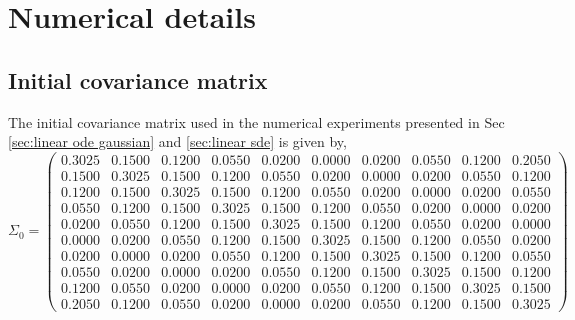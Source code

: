 \documentclass[11pt, a4paper, oneside, reqno]{amsart}
\begin{document}
\section{Numerical details}\label{app:numerical details}
\subsection{Initial covariance matrix}
\noindent The initial covariance matrix used in the numerical experiments presented in Sec \ref{sec:linear ode gaussian} and \ref{sec:linear sde} is given by,
\[
\Sigma_0 =
\begin{pmatrix}
0.3025 & 0.1500 & 0.1200 & 0.0550 & 0.0200 & 0.0000 & 0.0200 & 0.0550 & 0.1200 & 0.2050 \\
0.1500 & 0.3025 & 0.1500 & 0.1200 & 0.0550 & 0.0200 & 0.0000 & 0.0200 & 0.0550 & 0.1200 \\
0.1200 & 0.1500 & 0.3025 & 0.1500 & 0.1200 & 0.0550 & 0.0200 & 0.0000 & 0.0200 & 0.0550 \\
0.0550 & 0.1200 & 0.1500 & 0.3025 & 0.1500 & 0.1200 & 0.0550 & 0.0200 & 0.0000 & 0.0200 \\
0.0200 & 0.0550 & 0.1200 & 0.1500 & 0.3025 & 0.1500 & 0.1200 & 0.0550 & 0.0200 & 0.0000 \\
0.0000 & 0.0200 & 0.0550 & 0.1200 & 0.1500 & 0.3025 & 0.1500 & 0.1200 & 0.0550 & 0.0200 \\
0.0200 & 0.0000 & 0.0200 & 0.0550 & 0.1200 & 0.1500 & 0.3025 & 0.1500 & 0.1200 & 0.0550 \\
0.0550 & 0.0200 & 0.0000 & 0.0200 & 0.0550 & 0.1200 & 0.1500 & 0.3025 & 0.1500 & 0.1200 \\
0.1200 & 0.0550 & 0.0200 & 0.0000 & 0.0200 & 0.0550 & 0.1200 & 0.1500 & 0.3025 & 0.1500 \\
0.2050 & 0.1200 & 0.0550 & 0.0200 & 0.0000 & 0.0200 & 0.0550 & 0.1200 & 0.1500 & 0.3025
\end{pmatrix}
\]
\end{document}
